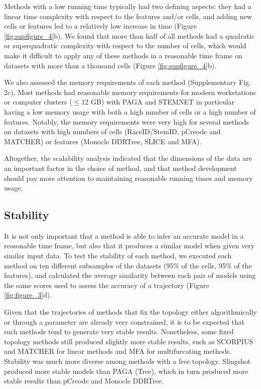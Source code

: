 Methods with a low running time typically had two defining aspects: they had a linear time complexity with respect to the features and/or cells, and adding new cells or features led to a relatively low increase in time (Figure \ref{fig:supfigure_4}b). We found that more than half of all methods had a quadratic or superquadratic complexity with respect to the number of cells, which would make it difficult to apply any of these methods in a reasonable time frame on datasets with more than a thousand cells (Figure \ref{fig:supfigure_4}b).

We also assessed the memory requirements of each method (Supplementary Fig. 2c). Most methods had reasonable memory requirements for modern workstations or computer clusters ($\leq$12 GB) with PAGA and STEMNET in particular having a low memory usage with both a high number of cells or a high number of features. Notably, the memory requirements were very high for several methods on datasets with high numbers of cells (RaceID/StemID, pCreode and MATCHER) or features (Monocle DDRTree, SLICE and MFA).

Altogether, the scalability analysis indicated that the dimensions of the data are an important factor in the choice of method, and that method development should pay more attention to maintaining reasonable running times and memory usage.

\subsection{Stability}

It is not only important that a method is able to infer an accurate model in a reasonable time frame, but also that it produces a similar model when given very similar input data. To test the stability of each method, we executed each method on ten different subsamples of the datasets (95$\%$ of the cells, 95$\%$ of the features), and calculated the average similarity between each pair of models using the same scores used to assess the accuracy of a trajectory (Figure \ref{fig:figure_3}d).

Given that the trajectories of methods that fix the topology either algorithmically or through a parameter are already very constrained, it is to be expected that such methods tend to generate very stable results. Nonetheless, some fixed topology methods still produced slightly more stable results, such as SCORPIUS and MATCHER for linear methods and MFA for multifurcating methods. Stability was much more diverse among methods with a free topology. Slingshot produced more stable models than PAGA (Tree), which in turn produced more stable results than pCreode and Monocle DDRTree.

